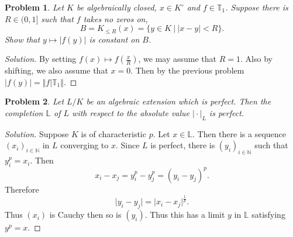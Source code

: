 \documentclass[8pt]{article}
\numberwithin{equation}{section}
\newenvironment{solution}{\begin{proof}[Solution]}{\end{proof}}
\newtheorem{problem}{Problem}[section]
\newcommand{\norm}[1]{\Vert #1 \Vert}
\newcommand{\N}[0]{\mathbb{N}}
\newcommand{\T}[0]{\mathbb{T}}
\newcommand{\sep}[0]{\:|\:}
\newcommand{\ab}[1]{\vert #1 \vert}
\begin{document}
\begin{problem}
  Let $K$ be algebraically closed, $x\in K^\circ$ and $f\in\T_1$. Suppose there is $R\in(0,1]$ such that $f$ takes no zeros on,
  \begin{equation*}
    B=K_{\leq R}(x) = \{y\in K\sep \ab{x-y}<R\}.
  \end{equation*}
  Show that $y\mapsto \ab{f(y)}$ is constant on $B$.
\end{problem}
\begin{solution}
  By setting $f(x)\mapsto f\left({\frac x R}\right)$, we may assume that $R=1$. Also by shifting, we also assume that $x=0$. Then by the previous problem $\ab{f(y)} = \norm{f|\T_1}$.
\end{solution}
\begin{problem}
  Let $L/K$ be an algebraic extension which is perfect. Then the completion $\mathbb{L}$ of $L$ with respect to the absolute value $\ab{\cdot}_L$ is perfect.
\end{problem}
\begin{solution}
  Suppose $K$ is of characteristic $p$. Let $x\in\mathbb{L}$. Then there is a sequence $(x_i)_{i\in\N}$ in $L$ converging to $x$. Since $L$ is perfect, there is $(y_i)_{i\in\N}$ such that $y_i^p=x_i$. Then 
  \begin{equation*}
    x_i-x_j = y^p_i-y^p_j = (y_i-y_j)^p.
  \end{equation*}
  Therefore 
  \begin{equation*}
    \vert y_i-y_j\vert = \vert x_i-x_j\vert^{{\frac 1 p}}.
  \end{equation*}
  Thus $(x_i)$ is Cauchy then so is $(y_i)$. Thus this has a limit $y$ in $\mathbb{L}$ satisfying $y^p=x$.
\end{solution}
\end{document}
